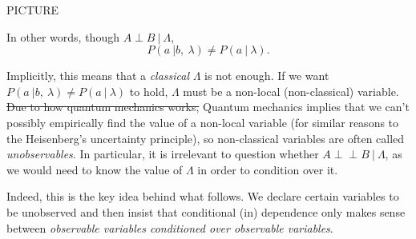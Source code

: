 \documentclass[11pt, oneside]{article}   	%
\def\ci{\perp\!\!\!\perp}
\newcommand{\sophie}[1]{{\color{cyan}#1}}
\newcommand{\pablo}[1]{{\color{red}#1}}
\begin{document}
PICTURE

In other words, though $A \perp B \ | \ \Lambda$, \[ P(a \ | b,\ \lambda) \neq P(a \ | \ \lambda).\]

Implicitly, this means that a \textit{classical} $\Lambda$ is not enough. \pablo{If we want \(P(a \ | b,\ \lambda) \neq P(a \ | \ \lambda)\) to hold, \(\Lambda\) must be a non-local (non-classical) variable}. \sout{\pablo{Due to how quantum mechanics works,}} \sophie{Quantum mechanics implies that}\pablo{ we can't possibly empirically find the value of a non-local variable (for similar reasons to the Heisenberg's uncertainty principle), so non-classical variables are often called \textit{unobservables}}. In particular, it is irrelevant to question whether $A \ci B \ | \ \Lambda$, \pablo{as we would need to know the value of \(\Lambda\) in order to condition over it}.

Indeed, this is the key idea behind what follows. We declare certain variables to be unobserved and then insist that conditional (in)
dependence only makes sense between \emph{observable variables conditioned over observable variables}.


%
%
%
%
%
%
%
%
%
%
%
%
%
%
%
\end{document}
